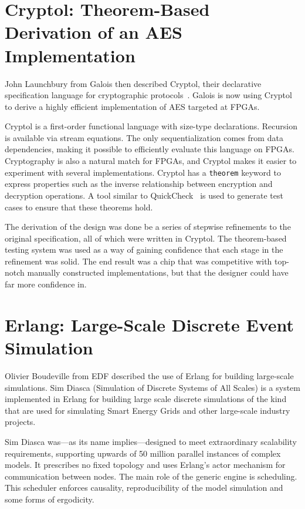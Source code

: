 \documentclass{jfp1}
\begin{document}
\section{Cryptol: Theorem-Based Derivation of an AES Implementation}

John Launchbury from Galois then described Cryptol, their
declarative specification language for cryptographic
protocols~\cite{Erkok:2009:PES:1481848.1481860}.
Galois is now using Cryptol to derive a highly efficient implementation of AES targeted at FPGAs.

Cryptol is a first-order functional language with size-type
declarations.  Recursion is available via stream equations.  The only
sequentialization comes from data dependencies, making it possible to
efficiently evaluate this language on FPGAs. Cryptography is also a
natural match for FPGAs, and Cryptol makes it easier to experiment with
several implementations. Cryptol has a {\tt theorem} keyword to express
properties such as the inverse relationship between encryption and
decryption operations. A tool similar to QuickCheck~\cite{Claessen:2000:QLT:351240.351266} is used to generate test cases to ensure that these theorems hold.

The derivation of the design was done be a series of stepwise
refinements to the original specification, all of which were written in
Cryptol.  The theorem-based testing system was used as a way of gaining
confidence that each stage in the refinement was solid.  The end result
was a chip that was competitive with top-notch manually constructed
implementations, but that the designer could have far more confidence in.

\section{Erlang: Large-Scale Discrete Event Simulation}

Olivier Boudeville from EDF described the use of Erlang for building
large-scale simulations.  Sim Diasca (Simulation of Discrete Systems of
All Scales) is a system implemented in Erlang for building large scale
discrete simulations of the kind that are used for simulating Smart
Energy Grids and other large-scale industry projects.

Sim Diasca was---as its name implies---designed to meet extraordinary
scalability requirements, supporting upwards of 50 million parallel
instances of complex models.  It prescribes no fixed topology and uses
Erlang's actor mechanism for communication between nodes.  The main role
of the generic engine is scheduling.  This scheduler enforces causality,
reproducibility of the model simulation and some forms of ergodicity.
\end{document}
